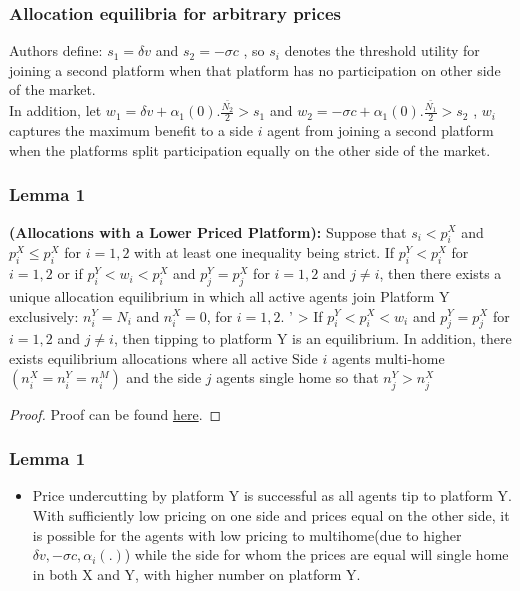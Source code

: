 \documentclass[11pt]{beamer}
\theoremstyle{boldstyle}
\begin{document}
\begin{frame}
	\frametitle{Allocation equilibria for arbitrary prices}
	Authors define: $s_1=\delta v$ and $s_2=-\sigma c$ , so $s_i$ denotes the threshold utility for joining a second platform when that platform has no participation on other side of the market.\\
	
	In addition, let $w_1=\delta v + \alpha_1(0).\frac{\bar{N_2}}{2}>s_1$ and $w_2=-\sigma c + \alpha_1(0).\frac{\bar{N_1}}{2}>s_2$ , $w_i$ captures the maximum benefit to a side $i$ agent from joining a second platform when the platforms split participation equally on the other side of the market. 
	
	
\end{frame}
\begin{frame}
	\frametitle{Lemma 1}
	\begin{lemma}
		\textbf{(Allocations with a Lower Priced Platform):} Suppose that $s_i<p_i^X$ and $p_i^X \leq p_i^X$ for $i=1,2$ with at least one inequality being strict. If $p_i^Y<p_i^X$ for $i=1,2$ or if $p_i^Y<w_i<p_i^X$  and $p_j^Y=p_j^X$ for $i=1,2$ and $j\neq i$, then there exists a unique allocation equilibrium in which all active agents join Platform Y exclusively: $n_i^Y=N_i$ and $n_i^X=0$, for $i=1,2$. '
		> If $p_i^Y<p_i^X<w_i$  and $p_j^Y=p_j^X$ for $i=1,2$ and $j \neq i$, then tipping to platform Y is an equilibrium. In addition, there exists equilibrium allocations where all active Side $i$ agents multi-home $(n_i^X=n_i^Y=n_i^M)$ and the side $j$ agents single home so that $n_j^Y>n_j^X$
		
	\end{lemma}
	\begin{proof}
		Proof can be found  \href{https://shorturl.at/ZrOPF}{here}.
	\end{proof}
\end{frame}

\begin{frame}
	\frametitle{Lemma 1}
	\begin{itemize}
		\item Price undercutting by platform Y is successful as all agents tip to platform Y. With sufficiently low pricing on one side and prices equal on the other side, it is possible for the agents with low pricing to multihome(due to higher $\delta v, -\sigma c, \alpha_i(.)$) while the side for whom the prices are equal will single home in both X and Y, with higher number on platform Y. 
	\end{itemize}
\end{frame}
\end{document}
